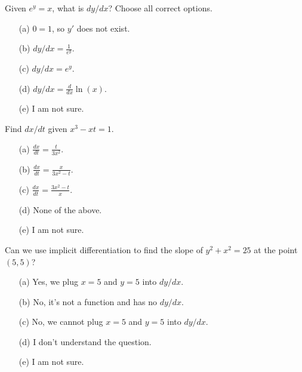 \documentclass[14pt]{beamer}
\begin{document}
\begin{frame}
  Given \(e^{y} = x\), what is \(dy/dx\)? Choose all correct options.

  \medskip
  \begin{itemize} \setlength\itemsep{2ex}
    \item[(a)] \(0 = 1\), so \(y'\) does not exist.
    \item[(b)] \(dy/dx = \tfrac{1}{e^{y}}\).
    \item[(c)] \(dy/dx = e^{y}\).
    \item[(d)] \(dy/dx = \tfrac{d}{dx} \ln(x)\).
    \item[(e)] I am not sure.
  \end{itemize} 
\end{frame}


\begin{frame}
  Find \(dx/dt\) given \(x^{3} - xt = 1\).

  \medskip
  \begin{itemize} \setlength\itemsep{2ex}
    \item[(a)] \(\frac{dx}{dt} = \frac{t}{3x^{2}}\).
    \item[(b)] \(\frac{dx}{dt} = \frac{x}{3x^{2} - t}\).
    \item[(c)] \(\frac{dx}{dt} = \frac{3x^{2} - t}{x}\).
    \item[(d)] None of the above.
    \item[(e)] I am not sure.
  \end{itemize} 
\end{frame}

\begin{frame}
  Can we use implicit differentiation to find the slope of \(y^{2} + x^{2} = 25\) at the point \((5,5)\)?

  \medskip
  \begin{itemize} \setlength\itemsep{2ex}
    \item[(a)] Yes, we plug \(x = 5\) and \(y = 5\) into \(dy/dx\).
    \item[(b)] No, it's not a function and has no \(dy/dx\).
    \item[(c)] No, we cannot plug \(x = 5\) and \(y = 5\) into \(dy/dx\).
    \item[(d)] I don't understand the question.
    \item[(e)] I am not sure.
  \end{itemize} 
\end{frame}
\end{document}
